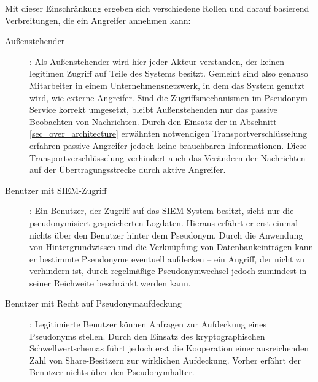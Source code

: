 Mit dieser Einschränkung ergeben sich verschiedene Rollen und darauf basierend Verbreitungen, die ein Angreifer annehmen kann:

\begin{description}
  \item[Außenstehender]: Als Außenstehender wird hier jeder Akteur verstanden, der keinen legitimen Zugriff auf Teile des Systems besitzt. Gemeint sind also genauso Mitarbeiter in einem Unternehmensnetzwerk, in dem das System genutzt wird, wie externe Angreifer. Sind die  Zugriffsmechanismen im Pseudonym-Service korrekt umgesetzt, bleibt Außenstehenden nur das passive Beobachten von Nachrichten. Durch den Einsatz der in Abschnitt \ref{sec_over_architecture} erwähnten notwendigen Transportverschlüsselung erfahren passive Angreifer jedoch keine brauchbaren Informationen. Diese Transportverschlüsselung verhindert auch das Verändern der Nachrichten auf der Übertragungsstrecke durch aktive Angreifer.
  
  \item[Benutzer mit SIEM-Zugriff]: Ein Benutzer, der Zugriff auf das SIEM-System besitzt, sieht nur die pseudonymisiert gespeicherten Logdaten. Hieraus erfährt er erst einmal nichts über den Benutzer hinter dem Pseudonym. Durch die Anwendung von Hintergrundwissen und die Verknüpfung von Datenbankeinträgen kann er bestimmte Pseudonyme eventuell aufdecken -- ein Angriff, der nicht zu verhindern ist, durch regelmäßige Pseudonymwechsel jedoch zumindest in seiner Reichweite beschränkt werden kann.
  
  \item[Benutzer mit Recht auf Pseudonymaufdeckung]: Legitimierte Benutzer können Anfragen zur Aufdeckung eines Pseudonyms stellen. Durch den Einsatz des kryptographischen Schwellwertschemas führt jedoch erst die Kooperation einer ausreichenden Zahl von Share-Besitzern zur wirklichen Aufdeckung. Vorher erfährt der Benutzer nichts über den Pseudonymhalter.
  

\end{description}
